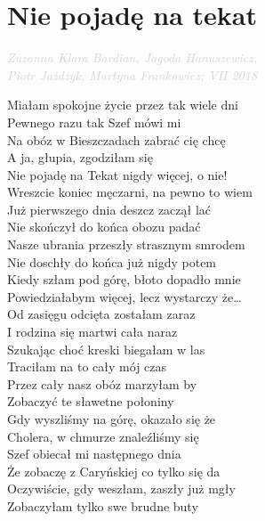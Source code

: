 \documentclass[a5paper, 10pt]{book}
\begin{document}
\newpage
\section{Nie pojadę na tekat}\textcolor{lightgray}{\textit{Zuzanna Klara Bardian, Jagoda Hanuszewicz,\\ \hspace*{\fill} Piotr Jażdżyk, Martyna Frankowicz; VII 2018}}\\
\begin{minipage}[t]{0.8\textwidth}
  Miałam spokojne życie przez tak wiele dni	\\
  Pewnego razu tak Szef mówi mi	\\
  Na obóz w Bieszczadach zabrać cię chcę 	\\
  A ja, głupia, zgodziłam się	\\

  \hspace*{5mm}Nie pojadę na Tekat nigdy więcej, o nie!		\\
  \hspace*{5mm}Wreszcie koniec męczarni, na pewno to wiem	\\

  Już pierwszego dnia deszcz zaczął lać 		\\
  Nie skończył do końca obozu padać\\
  Nasze ubrania przeszły strasznym smrodem 	\\
  Nie doschły do końca już nigdy potem\\

  Kiedy szłam pod górę, błoto dopadło mnie 	\\
  Powiedziałabym więcej, lecz wystarczy że…\\

  Od zasięgu odcięta zostałam zaraz 		\\
  I rodzina się martwi cała naraz	\\
  Szukając choć kreski biegałam w las 		\\
  Traciłam na to cały mój czas	\\

  Przez cały nasz obóz marzyłam by		\\
  Zobaczyć te sławetne połoniny	\\
  Gdy wyszliśmy na górę, okazało się że		\\
  Cholera, w chmurze znaleźliśmy się\\

  Szef obiecał mi następnego dnia		\\
  Że zobaczę z Caryńskiej co tylko się da\\
  Oczywiście, gdy weszłam, zaszły już mgły 	\\
  Zobaczyłam tylko swe brudne buty\\


\end{minipage}
\end{document}
